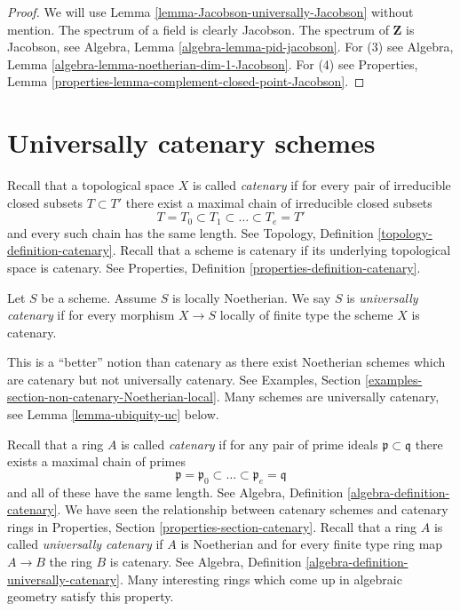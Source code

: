 \begin{proof}
We will use Lemma \ref{lemma-Jacobson-universally-Jacobson} without mention.
The spectrum of a field is clearly Jacobson.
The spectrum of $\mathbf{Z}$ is Jacobson, see
Algebra, Lemma \ref{algebra-lemma-pid-jacobson}.
For (3) see
Algebra, Lemma \ref{algebra-lemma-noetherian-dim-1-Jacobson}.
For (4) see
Properties, Lemma \ref{properties-lemma-complement-closed-point-Jacobson}.
\end{proof}







\section{Universally catenary schemes}
\label{section-universally-catenary}

\noindent
Recall that a topological space $X$ is called {\it catenary} if
for every pair of irreducible closed subsets $T \subset T'$
there exist a maximal chain of irreducible closed subsets
$$
T = T_0 \subset T_1 \subset \ldots \subset T_e = T'
$$
and every such chain has the same length. See
Topology, Definition \ref{topology-definition-catenary}.
Recall that a scheme is catenary if its underlying topological space
is catenary. See Properties, Definition \ref{properties-definition-catenary}.

\begin{definition}
\label{definition-universally-catenary}
Let $S$ be a scheme. Assume $S$ is locally Noetherian.
We say $S$ is {\it universally catenary} if for every
morphism $X \to S$ locally of finite type the scheme $X$ is catenary.
\end{definition}

\noindent
This is a ``better'' notion than catenary as there exist Noetherian schemes
which are catenary but not universally catenary. See
Examples, Section \ref{examples-section-non-catenary-Noetherian-local}.
Many schemes are universally catenary, see
Lemma \ref{lemma-ubiquity-uc} below.

\medskip\noindent
Recall that a ring $A$ is called {\it catenary} if
for any pair of prime ideals $\mathfrak p \subset \mathfrak q$
there exists a maximal chain of primes
$$
\mathfrak p =
\mathfrak p_0 \subset \ldots \subset \mathfrak p_e
= \mathfrak q
$$
and all of these have the same length. See
Algebra, Definition \ref{algebra-definition-catenary}.
We have seen the relationship between catenary schemes and
catenary rings in Properties, Section \ref{properties-section-catenary}.
Recall that a ring $A$ is called {\it universally catenary} if
$A$ is Noetherian and for every finite type ring map $A \to B$
the ring $B$ is catenary. See
Algebra, Definition \ref{algebra-definition-universally-catenary}.
Many interesting rings which come up
in algebraic geometry satisfy this property.

